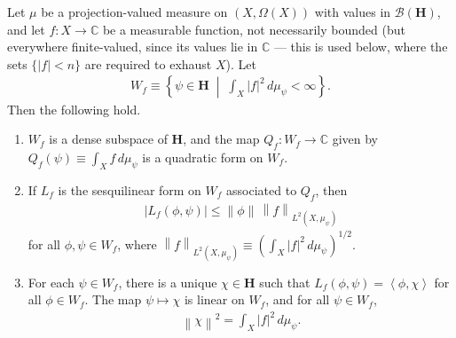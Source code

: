 \begin{proposition}
    \label{prpstn:hall-10.2}
    \leanok
    Let $\mu$ be a projection-valued measure on $(X, \Omega(X))$ with values in $\mathcal{B}(\mathbf{H})$, and let $f : X \to \mathbb{C}$ be a measurable function, not necessarily bounded (but everywhere finite-valued, since its values lie in $\mathbb{C}$ — this is used below, where the sets $\{ \lvert f \rvert < n \}$ are required to exhaust $X$). Let
    \begin{align}
        W_f \equiv \left\{ \psi \in \mathbf{H} \;\middle|\; \int_X \lvert f \rvert^2 \, d\mu_\psi < \infty \right\}.
    \end{align}
    Then the following hold.
    \begin{enumerate}
        \item $W_f$ is a dense subspace of $\mathbf{H}$, and the map $Q_f : W_f \to \mathbb{C}$ given by $Q_f(\psi) \equiv \int_X f \, d\mu_\psi$ is a quadratic form on $W_f$.
        \item If $L_f$ is the sesquilinear form on $W_f$ associated to $Q_f$, then
        \begin{align}
            \lvert L_f(\phi, \psi) \rvert \le \left\| \phi \right\| \, \left\| f \right\|_{L^2(X, \mu_\psi)}
        \end{align}
        for all $\phi, \psi \in W_f$, where $\left\| f \right\|_{L^2(X, \mu_\psi)} \equiv \left( \int_X \lvert f \rvert^2 \, d\mu_\psi \right)^{1/2}$.
        \item For each $\psi \in W_f$, there is a unique $\chi \in \mathbf{H}$ such that $L_f(\phi, \psi) = \left< \phi, \chi \right>$ for all $\phi \in W_f$. The map $\psi \mapsto \chi$ is linear on $W_f$, and for all $\psi \in W_f$,
        \begin{align}
            \left\| \chi \right\|^2 = \int_X \lvert f \rvert^2 \, d\mu_\psi.
        \end{align}
    \end{enumerate}
\end{proposition}
